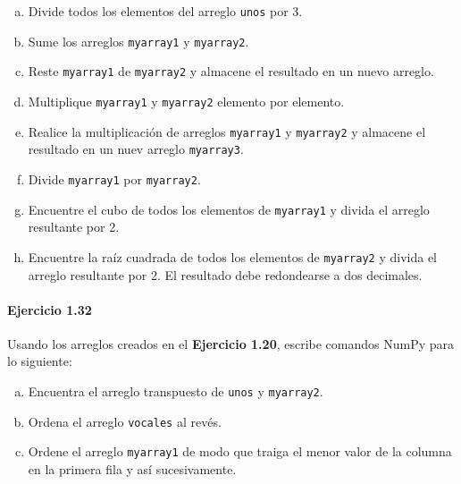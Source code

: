 \begin{enumerate}[(a)]
	\item

	      Divide todos los elementos del arreglo
	      \texttt{unos} por 3.

	\item

	      Sume los arreglos \texttt{myarray1} y
	      \texttt{myarray2}.

	\item

	      Reste \texttt{myarray1} de
	      \texttt{myarray2} y almacene el resultado en un
	      nuevo arreglo.

	\item

	      Multiplique \texttt{myarray1} y
	      \texttt{myarray2} elemento por elemento.

	\item

	      Realice la multiplicación de arreglos
	      \texttt{myarray1} y \texttt{myarray2}
	      y almacene el resultado en un nuev arreglo
	      \texttt{myarray3}.

	\item

	      Divide \texttt{myarray1} por
	      \texttt{myarray2}.

	\item

	      Encuentre el cubo de todos los elementos de
	      \texttt{myarray1} y divida el arreglo resultante
	      por 2.

	\item

	      Encuentre la raíz cuadrada de todos los elementos de
	      \texttt{myarray2} y divida el arreglo resultante
	      por 2.
	      El resultado debe redondearse a dos decimales.
\end{enumerate}

\paragraph{\color{DarkBlue}Ejercicio 1.32}
Usando los arreglos creados en el \textbf{Ejercicio 1.20},
escribe comandos NumPy para lo siguiente:

\begin{enumerate}[(a)]
	\item

	      Encuentra el arreglo transpuesto de \texttt{unos}
	      y \texttt{myarray2}.

	\item

	      Ordena el arreglo \texttt{vocales} al revés.

	\item

	      Ordene el arreglo \texttt{myarray1} de modo que
	      traiga el menor valor de la columna en la primera fila y así
	      sucesivamente.
\end{enumerate}

